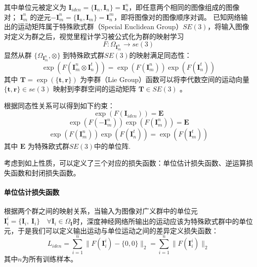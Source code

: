 其中单位元被定义为 $\mathbf{I}_{iden} = \{\mathbf{I}_n,\mathbf{I}_n\}=\mathbf{I}_n^n$，即任意两个相同的图像组成的图像对；
$\mathbf{I}_m^{n}$ 的逆元$ -\mathbf{I}_m^n = \{\mathbf{I}_n,\mathbf{I}_m\} = \mathbf{I}_n^{m}$，即将图像对的图像顺序对调。
已知网络输出的运动矩阵属于特殊欧式群（Special Euclidean Group）$SE(3)$，将输入图像对定义为群之后，视觉里程计学习被公式化为群的映射学习
\begin{equation}
    F: \Omega_{\mathbf{I}_m^n} \to se(3)
\end{equation}
显然从群 $\{\Omega_{\mathbf{I}_m^n},\otimes\}$ 到特殊欧式群$SE(3)$的映射满足同态性：
 \begin{equation}
     \exp(F(\mathbf{I}_m^n\otimes\mathbf{I}_n^t))=\exp(F(\mathbf{I}_m^n))\exp(F(\mathbf{I}_n^t))
 \end{equation}
 其中 $\mathbf{T} = \exp(\{\mathbf{t},\mathbf{r}\})$ 为李群（Lie Group）函数可以将李代数空间的运动向量$\{\mathbf{t},\mathbf{r}\} \in se(3)$
 映射到李群空间的运动矩阵 $\mathbf{T} \in SE(3)$ \cite{onishchik1993lie}。

根据同态性关系可以得到如下约束：
\begin{equation}
    \exp(F(\mathbf{I}_{iden})) = \mathbf{E} 
\end{equation}
\begin{equation}
    \exp(F(-\mathbf{I}_m^{n}))\exp(F(\mathbf{I}_m^{n})) = \mathbf{E} 
\end{equation}
\begin{equation}
    \exp(F(\mathbf{I}_{m}^{n}))\exp(F(\mathbf{I}_{n}^{t})) = \exp(F(\mathbf{I}_{m}^{t}))
\end{equation}
其中 $\mathbf{E}$ 为特殊欧式群$SE(3)$中的单位阵.

考虑到如上性质，可以定义了三个对应的损失函数：单位估计损失函数、逆运算损失函数和封闭损失函数。
\paragraph{单位估计损失函数} 
根据两个群之间的映射关系，当输入为图像对广义群中的单位元$\mathbf{I}_i^i = \{\mathbf{I}_i,\ \mathbf{I}_i\} \quad \forall \mathbf{I}_i \in \Omega_{\mathbf{I}}$时，深度神经网络所输出的运动应该为特殊欧式群中的单位元，于是我们可以定义输出运动与单位运动之间的差异定义损失函数：
\begin{equation} 
    L_{iden} = \sum_{i=1}^{n}\|F(\mathbf{I}_{i}^{i})-\{0,0\}\|_2 = \sum_{i=1}^{n}\|F(\mathbf{I}_{i}^{i})\|_2 
    \label{eq:identity_loss}
\end{equation}
其中$n$为所有训练样本。
